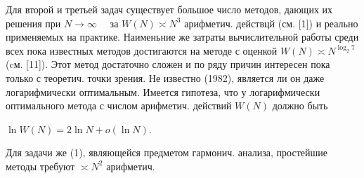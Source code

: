 \documentclass[10pt]{article}
\begin{document}
Для второй и третьей задач существует большое число методов, дающих их решения при $N \rightarrow \infty \quad$ за $W(N) \asymp N^{3}$ арифметич. действцй (см. [1]) и реально применяемых на практике. Наименьние же затраты вычислительной работы среди всех пока известных методов достигаются на методе с оценкой $W(N) \asymp N^{\log _{2} 7}$ (cм. [11]). Этот метод достаточно сложен и по ряду причин интересен пока только с теоретич. точки зрения. Не известно (1982), является ли он даже логарифмически оптимальным. Имеется гипотеза, что у логарифмически оптимального метода с числом арифметич. действий $W(N)$ должно быть



$\ln W(N)=2 \ln N+o(\ln N)$.



Для задачи же (1), являющейся предметом гармонич. анализа, простейшие методы требуют $\asymp N^{2}$ арифметич.
\end{document}
